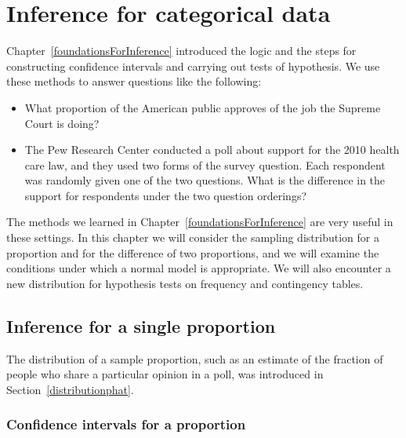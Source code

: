 \chapter{Inference for categorical data}
\label{inferenceForCategoricalData}

Chapter~\ref{foundationsForInference} introduced the logic and the steps for constructing confidence intervals and carrying out tests of hypothesis. We use these methods to answer questions like the following:
\begin{itemize}
\setlength{\itemsep}{0mm}
\item What proportion of the American public approves of the job the Supreme Court is doing?
\item The Pew Research Center conducted a poll about support for the 2010 health care law, and they used two forms of the survey question. Each respondent was randomly given one of the two questions. What is the difference in the support for respondents under the two question orderings?
\end{itemize}
The methods we learned in Chapter~\ref{foundationsForInference} are very useful in these settings. In this chapter we will consider the sampling distribution for a proportion and for the difference of two proportions, and we will examine the conditions under which a normal model is appropriate. We will also encounter a new distribution for hypothesis tests on frequency and contingency tables.



\section[Inference for a single proportion]{Inference for a single proportion  }
\label{singleProportion}

The distribution of a sample proportion, such as an estimate of the fraction of people who share a particular opinion in a poll, was introduced in Section~\ref{distributionphat}.

\subsection{Confidence intervals for a proportion}
\label{confIntForPropSection}


